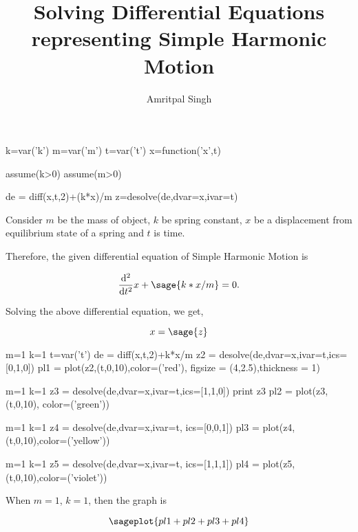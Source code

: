 \documentclass{article}
\title{Solving Differential Equations representing Simple Harmonic Motion}
\author{Amritpal Singh}
\begin{document}
\maketitle

\begin{sagesilent}
k=var('k')
m=var('m')
t=var('t')
x=function('x',t)

assume(k>0)
assume(m>0)

de = diff(x,t,2)+(k*x)/m
z=desolve(de,dvar=x,ivar=t)
\end{sagesilent}
Consider $m$ be the mass of object, $k$ be spring constant, $x$ be a displacement from equilibrium state of a spring and $t$ is time. 

Therefore, the given differential equation of Simple Harmonic Motion is  

\begin{comment}
\begin{sagesilent}
F=var('F') 
a=var('a')
\end{sagesilent}

\[
 \sage{F==m*a} --1 \\ 
 \sage{F==-k*x} --2
\]
\end{comment}

\[
  \frac{\mathrm{d}^{2}}{\mathrm{d}t^{2}}x +  \sage{k*x/m} = 0.
\]


Solving the above differential equation, we get,

$$x = \sage{z}$$












\begin{sagesilent}
m=1
k=1
t=var('t')
de = diff(x,t,2)+k*x/m
z2 = desolve(de,dvar=x,ivar=t,ics=[0,1,0])
pl1 = plot(z2,(t,0,10),color=('red'), figsize = (4,2.5),thickness = 1)

m=1
k=1
z3 = desolve(de,dvar=x,ivar=t,ics=[1,1,0])
print z3
pl2 = plot(z3,(t,0,10), color=('green'))

m=1
k=1
z4 = desolve(de,dvar=x,ivar=t, ics=[0,0,1])
pl3 = plot(z4,(t,0,10),color=('yellow'))

m=1
k=1
z5 = desolve(de,dvar=x,ivar=t, ics=[1,1,1])
pl4 = plot(z5,(t,0,10),color=('violet'))
\end{sagesilent}


When $m=1$, $k=1$, then the graph is

$$\sageplot{pl1+pl2+pl3+pl4}$$
\end{document}

